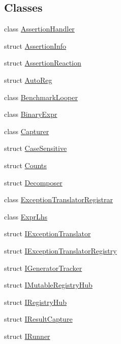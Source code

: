 \subsection*{Classes}
\begin{DoxyCompactItemize}
\item 
class \mbox{\hyperlink{class_catch_1_1_assertion_handler}{Assertion\+Handler}}
\item 
struct \mbox{\hyperlink{struct_catch_1_1_assertion_info}{Assertion\+Info}}
\item 
struct \mbox{\hyperlink{struct_catch_1_1_assertion_reaction}{Assertion\+Reaction}}
\item 
struct \mbox{\hyperlink{struct_catch_1_1_auto_reg}{Auto\+Reg}}
\item 
class \mbox{\hyperlink{class_catch_1_1_benchmark_looper}{Benchmark\+Looper}}
\item 
class \mbox{\hyperlink{class_catch_1_1_binary_expr}{Binary\+Expr}}
\item 
class \mbox{\hyperlink{class_catch_1_1_capturer}{Capturer}}
\item 
struct \mbox{\hyperlink{struct_catch_1_1_case_sensitive}{Case\+Sensitive}}
\item 
struct \mbox{\hyperlink{struct_catch_1_1_counts}{Counts}}
\item 
struct \mbox{\hyperlink{struct_catch_1_1_decomposer}{Decomposer}}
\item 
class \mbox{\hyperlink{class_catch_1_1_exception_translator_registrar}{Exception\+Translator\+Registrar}}
\item 
class \mbox{\hyperlink{class_catch_1_1_expr_lhs}{Expr\+Lhs}}
\item 
struct \mbox{\hyperlink{struct_catch_1_1_i_exception_translator}{I\+Exception\+Translator}}
\item 
struct \mbox{\hyperlink{struct_catch_1_1_i_exception_translator_registry}{I\+Exception\+Translator\+Registry}}
\item 
struct \mbox{\hyperlink{struct_catch_1_1_i_generator_tracker}{I\+Generator\+Tracker}}
\item 
struct \mbox{\hyperlink{struct_catch_1_1_i_mutable_registry_hub}{I\+Mutable\+Registry\+Hub}}
\item 
struct \mbox{\hyperlink{struct_catch_1_1_i_registry_hub}{I\+Registry\+Hub}}
\item 
struct \mbox{\hyperlink{struct_catch_1_1_i_result_capture}{I\+Result\+Capture}}
\item 
struct \mbox{\hyperlink{struct_catch_1_1_i_runner}{I\+Runner}}

\end{DoxyCompactItemize}
